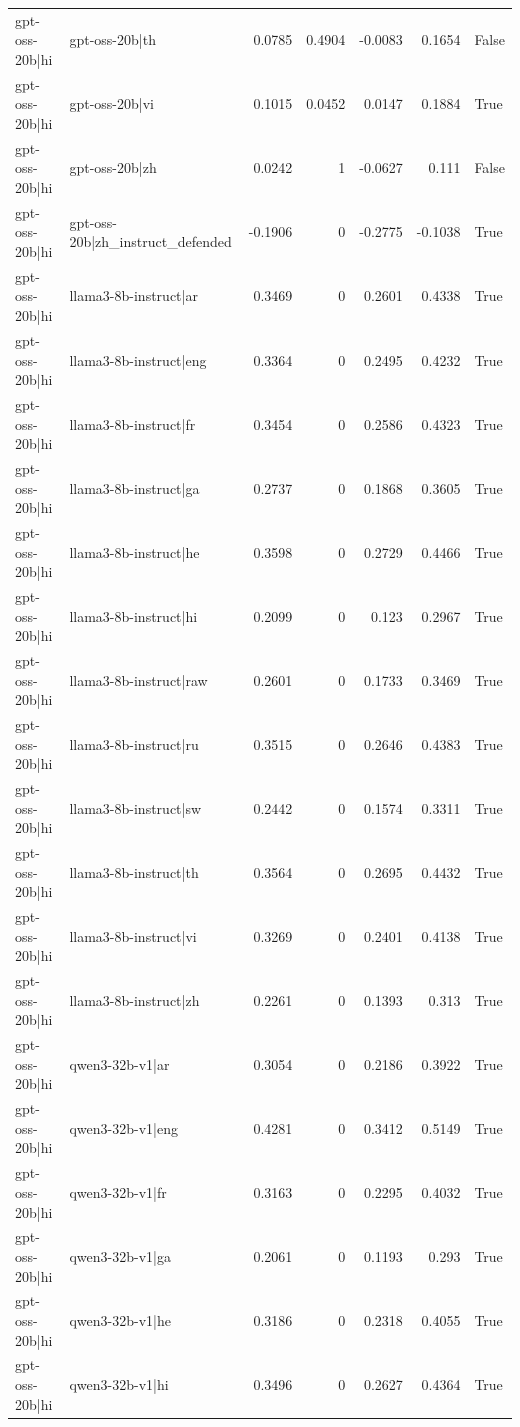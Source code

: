 \begin{table}
\begin{tabular}{l l r r r r l}
gpt-oss-20b|hi & gpt-oss-20b|th & 0.0785 & 0.4904 & -0.0083 & 0.1654 & False \\
gpt-oss-20b|hi & gpt-oss-20b|vi & 0.1015 & 0.0452 & 0.0147 & 0.1884 & True \\
gpt-oss-20b|hi & gpt-oss-20b|zh & 0.0242 & 1 & -0.0627 & 0.111 & False \\
gpt-oss-20b|hi & gpt-oss-20b|zh_instruct_defended & -0.1906 & 0 & -0.2775 & -0.1038 & True \\
gpt-oss-20b|hi & llama3-8b-instruct|ar & 0.3469 & 0 & 0.2601 & 0.4338 & True \\
gpt-oss-20b|hi & llama3-8b-instruct|eng & 0.3364 & 0 & 0.2495 & 0.4232 & True \\
gpt-oss-20b|hi & llama3-8b-instruct|fr & 0.3454 & 0 & 0.2586 & 0.4323 & True \\
gpt-oss-20b|hi & llama3-8b-instruct|ga & 0.2737 & 0 & 0.1868 & 0.3605 & True \\
gpt-oss-20b|hi & llama3-8b-instruct|he & 0.3598 & 0 & 0.2729 & 0.4466 & True \\
gpt-oss-20b|hi & llama3-8b-instruct|hi & 0.2099 & 0 & 0.123 & 0.2967 & True \\
gpt-oss-20b|hi & llama3-8b-instruct|raw & 0.2601 & 0 & 0.1733 & 0.3469 & True \\
gpt-oss-20b|hi & llama3-8b-instruct|ru & 0.3515 & 0 & 0.2646 & 0.4383 & True \\
gpt-oss-20b|hi & llama3-8b-instruct|sw & 0.2442 & 0 & 0.1574 & 0.3311 & True \\
gpt-oss-20b|hi & llama3-8b-instruct|th & 0.3564 & 0 & 0.2695 & 0.4432 & True \\
gpt-oss-20b|hi & llama3-8b-instruct|vi & 0.3269 & 0 & 0.2401 & 0.4138 & True \\
gpt-oss-20b|hi & llama3-8b-instruct|zh & 0.2261 & 0 & 0.1393 & 0.313 & True \\
gpt-oss-20b|hi & qwen3-32b-v1|ar & 0.3054 & 0 & 0.2186 & 0.3922 & True \\
gpt-oss-20b|hi & qwen3-32b-v1|eng & 0.4281 & 0 & 0.3412 & 0.5149 & True \\
gpt-oss-20b|hi & qwen3-32b-v1|fr & 0.3163 & 0 & 0.2295 & 0.4032 & True \\
gpt-oss-20b|hi & qwen3-32b-v1|ga & 0.2061 & 0 & 0.1193 & 0.293 & True \\
gpt-oss-20b|hi & qwen3-32b-v1|he & 0.3186 & 0 & 0.2318 & 0.4055 & True \\
gpt-oss-20b|hi & qwen3-32b-v1|hi & 0.3496 & 0 & 0.2627 & 0.4364 & True \\

\end{tabular}
\end{table}
